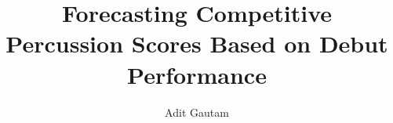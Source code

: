 \documentclass[sigconf,nonacm,11pt]{acmart}
\title{Forecasting Competitive Percussion Scores Based on Debut Performance}
\author{Adit Gautam}
\affiliation{%
  \institution{University of California San Diego}
  \city{La Jolla}
  \state{California}
  \country{USA}
}
\begin{document}
\maketitle
\raggedbottom











\small

\end{document}
